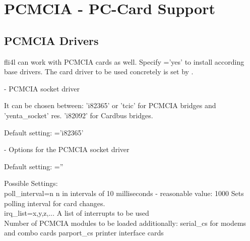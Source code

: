 {
\section {PCMCIA - PC-Card Support}
}

           
\subsection{PCMCIA Drivers}

    fli4l can work with PCMCIA cards as well. Specify
        ='yes' to install according base drivers.
    The card driver to be used concretely is set by
    .

\begin{description}
 - PCMCIA socket driver

It can be chosen between: 'i82365' or 'tcic' for PCMCIA bridges and 'yenta\_socket'
res. 'i82092' for Cardbus bridges.

        Default setting: ='i82365'


 - Options for the PCMCIA socket driver

        Default setting: =''

        Possible Settings: \\
                poll\_interval=n        n in intervals of 10 milliseconds - reasonable value: 1000
                                        Sets polling interval for card changes. \\
                irq\_list=x,y,z,...     A list of interrupts to be used \\


        Number of PCMCIA modules to be loaded additionally:
                serial\_cs		for modems and combo cards
                parport\_cs             printer interface cards
                
\end{description}
